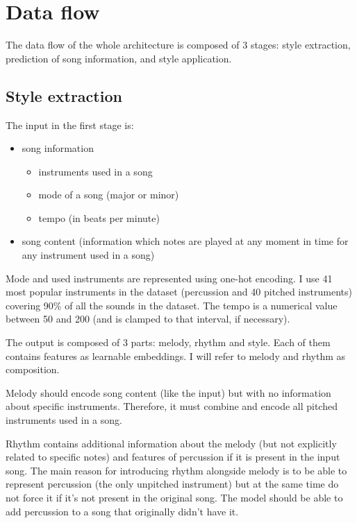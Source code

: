\documentclass[en]{pracamgr}
\begin{document}
\chapter{Data flow}

The data flow of the whole architecture is composed of 3 stages: style extraction, prediction of song information, and style application.

\section{Style extraction}

The input in the first stage is:
\begin{itemize}
    \item song information
    \begin{itemize}
        \item instruments used in a song
        \item mode of a song (major or minor)
        \item tempo (in beats per minute)
    \end{itemize}
    \item song content (information which notes are played at any moment in time for any instrument used in a song)
\end{itemize}

Mode and used instruments are represented using one-hot encoding.
I use 41 most popular instruments in the dataset (percussion and 40 pitched instruments) covering 90\% of all the sounds in the dataset.
The tempo is a numerical value between 50 and 200 (and is clamped to that interval, if necessary).

The output is composed of 3 parts: melody, rhythm and style.
Each of them contains features as learnable embeddings.
I will refer to melody and rhythm as composition.

Melody should encode song content (like the input) but with no information about specific instruments.
Therefore, it must combine and encode all pitched instruments used in a song.

Rhythm contains additional information about the melody (but not explicitly related to specific notes) and features of percussion if it is present in the input song.
The main reason for introducing rhythm alongside melody is to be able to represent percussion (the only unpitched instrument) but at the same time do not force it if it's not present in the original song.
The model should be able to add percussion to a song that originally didn't have it.
\end{document}
